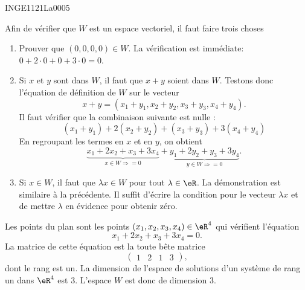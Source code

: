 

\begin{corrige}{INGE1121La0005}

	Afin de vérifier que $W$ est un espace vectoriel, il faut faire trois choses
	\begin{enumerate}

		\item
			Prouver que $(0,0,0,0)\in W$. La vérification est immédiate: $0+2\cdot 0+0+3\cdot 0=0$.
		\item
			Si $x$ et $y$ sont dans $W$, il faut que $x+y$ soient dans $W$. Testons donc l'équation de définition de $W$ sur le vecteur
			\begin{equation}
				x+y=(x_1+y_1,x_2+y_2,x_3+y_3,x_4+y_4).
			\end{equation}
			Il faut vérifier que la combinaison suivante est nulle :
			\begin{equation}
				(x_1+y_1)+2(x_2+y_2)+(x_3+y_3)+3(x_4+y_4)
			\end{equation}
			En regroupant les termes en $x$ et en $y$, on obtient
			\begin{equation}
				\underbrace{x_1+2x_2+x_3+3x_4}_{x\in W\Rightarrow =0}+\underbrace{y_1+2y_2+y_3+3y_4}_{y\in W\Rightarrow =0}.
			\end{equation}
		\item
			Si $x\in W$, il faut que $\lambda x\in W$ pour tout $\lambda\in\eR$. La démonstration est similaire à la précédente. Il suffit d'écrire la condition pour le vecteur $\lambda x$ et de mettre $\lambda$ en évidence pour obtenir zéro.

	\end{enumerate}

	Les points du plan sont les points $(x_1,x_2,x_3,x_4)\in\eR^4$ qui vérifient l'équation
	\begin{equation}
		x_1+2x_2+x_3+3x_4=0.
	\end{equation}
	La matrice de cette équation est la toute bête matrice
	\begin{equation}
		\begin{pmatrix} 
			1	&	2	&	1	&	3	
		\end{pmatrix},
	\end{equation}
	dont le rang est un. La dimension de l'espace de solutions d'un système de rang un dans $\eR^4$ est $3$. L'espace $W$ est donc de dimension $3$.


\end{corrige}
